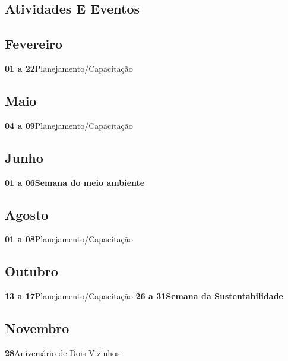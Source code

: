 \documentclass[thesis]{hmcposter}
\begin{document}
\begin{poster}
\normalsize \section{\color{hmcorange}Atividades E Eventos}\subsection{Fevereiro}\textbf{01 a 22}\quad \quad Planejamento/Capacitação \newline\subsection{Maio}\textbf{04 a 09}\quad \quad Planejamento/Capacitação \newline\subsection{Junho}\textbf{01 a 06}\quad \quad \textbf{Semana do meio ambiente} \newline\subsection{Agosto}\textbf{01 a 08}\quad \quad Planejamento/Capacitação \newline\subsection{Outubro}\textbf{13 a 17}\quad \quad Planejamento/Capacitação \newline\textbf{26 a 31}\quad \quad \textbf{Semana da Sustentabilidade} \newline\subsection{Novembro}\textbf{28}\quad \quad \quad \quad Aniversário de Dois Vizinhos \newline\end{poster}
\end{document}
